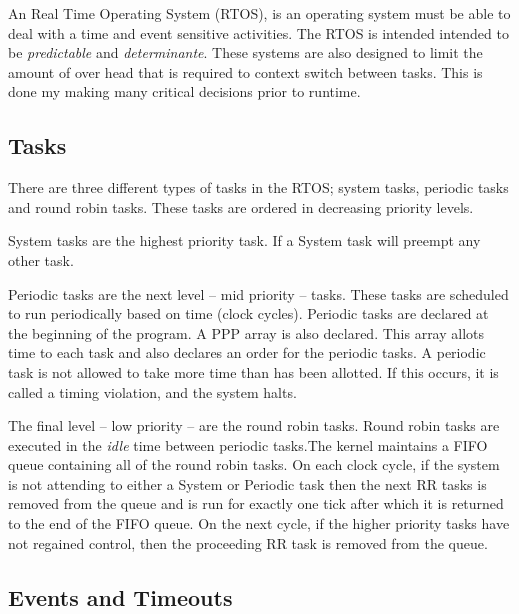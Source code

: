 

An Real Time Operating System (RTOS), is an operating system must be able to
deal with a time and event sensitive activities. The RTOS is intended intended
to be \textit{predictable} and \textit{determinante}\cite{RTOSMantis}. These
systems are also designed to limit the amount of over head that is required to
context switch between tasks. This is done my making many critical decisions
prior to runtime.



\subsection{Tasks}

There are three different types of tasks in the RTOS; system tasks, periodic tasks and round robin tasks. These tasks are ordered in decreasing priority levels. \\


System tasks are the highest priority task. If a System task will preempt any other task.\\


Periodic tasks are the next level -- mid priority -- tasks. These tasks are scheduled to run periodically based on time (clock cycles). 
Periodic tasks are declared at the beginning of the program. A PPP array is also declared. This array allots time to each task and also declares an order for the periodic tasks. A periodic task is not allowed to take more time than has been allotted. If this occurs, it is called a timing violation, and the system halts.  \\


The final level -- low priority -- are the round robin tasks. Round robin tasks are executed in the \textit{idle} time between periodic tasks.The kernel maintains a FIFO queue containing all of the round robin tasks. On each clock cycle, if the system is not attending to either a System or Periodic task then the next RR tasks is removed from the queue and is run for exactly one tick after which it is returned to the end of the FIFO queue. On the next cycle, if the higher priority tasks have not regained control, then the proceeding RR task is removed from the queue.  



\subsection{Events and Timeouts}

